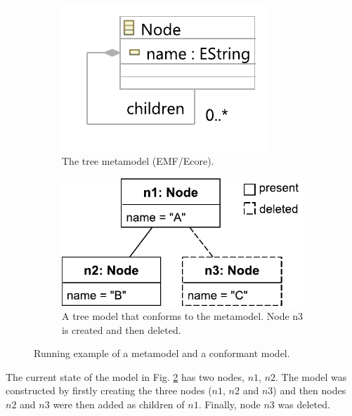 \documentclass{llncs}
\begin{document}
\vspace{-20pt}
\begin{figure}[ht]
\begin{subfigure}[t]{0.3\linewidth}
\centering
\includegraphics[width=0.8\linewidth]{node_metamodel}
\caption{The tree metamodel (EMF/Ecore).}
\label{fig:tree_metamodel}
\end{subfigure}
\hfill
\begin{subfigure}[t]{0.7\linewidth}
\centering
\includegraphics[width=0.6\linewidth]{initial_chart}
\caption{A tree model that conforms to the  metamodel.  Node n3 is created and then deleted.}
\label{fig:initial_model}
\end{subfigure}
\caption{Running example of a metamodel and a conformant model.}
\label{fig:append_speed}
\end{figure}

\vspace{-10pt}
The current state of the model in Fig. \ref{fig:initial_model} has two nodes, $n1$, $n2$.  The model was constructed by firstly creating the three nodes ($n1$, $n2$ and $n3$) and then nodes $n2$ and $n3$ were then added as children of $n1$. Finally, node $n3$ was deleted.
\end{document}
